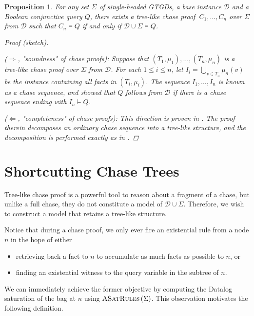 \documentclass[12pt]{report}
\theoremstyle{plain}
\newtheorem{proposition}[theorem]{Proposition}
\theoremstyle{definition}
\newcommand{\ASatRules}[1]{\ensuremath{\normalfont{\textsc{ASatRules}} \left( #1 \right)}}
\begin{document}
\begin{proposition}
\label{chase-proof-completeness}
  For any set $\Sigma$ of single-headed GTGDs, a base instance $\mathcal{D}$ and a Boolean conjunctive query $Q$, there exists a tree-like chase proof $\ C_1, \ldots, C_n$ over $\Sigma$ from $\mathcal{D}$ such that $C_n \models Q$ if and only if $\mathcal{D} \cup \Sigma \models Q$.
  \begin{proof}[Proof (sketch)] $ $\par
    ($\Longrightarrow$, "soundness" of chase proofs): Suppose that $(T_1, \mu_1), \ldots, (T_n, \mu_n)$ is a tree-like chase proof over $\Sigma$ from $\mathcal{D}$. For each $1 \leq i \leq n$, let $I_i = \bigcup_{v \in T_n} \mu_n(v)$ be the instance containing all facts in $(T_i, \mu_i)$. The sequence $I_1, \ldots, I_n$ is known as a \emph{chase sequence}, and \cite{fagin_kolaitis_miller_popa_2005} showed that $Q$ follows from $\mathcal{D}$ if there is a chase sequence ending with $I_n \models Q$.

    ($\Longleftarrow$, "completeness" of chase proofs): This direction is proven in \cite[Proposition 2.6.9]{kappelmann_2019}. The proof therein decomposes an ordinary chase sequence into a tree-like structure, and the decomposition is performed exactly as in .
  \end{proof}
\end{proposition}

\section{Shortcutting Chase Trees}

Tree-like chase proof is a powerful tool to reason about a fragment of a chase, but unlike a full chase, they do not constitute a model of $\mathcal{D} \cup \Sigma$. Therefore, we wish to construct a model that retains a tree-like structure.

Notice that during a chase proof, we only ever fire an existential rule from a node $n$ in the hope of either
\begin{itemize}
  \item retrieving back a fact to $n$ to accumulate as much facts as possible to $n$, or
  \item finding an existential witness to the query variable in the subtree of $n$.
\end{itemize}
We can immediately achieve the former objective by computing the Datalog saturation of the bag at $n$ using $\ASatRules{\Sigma}$. This observation motivates the following definition.
\end{document}
